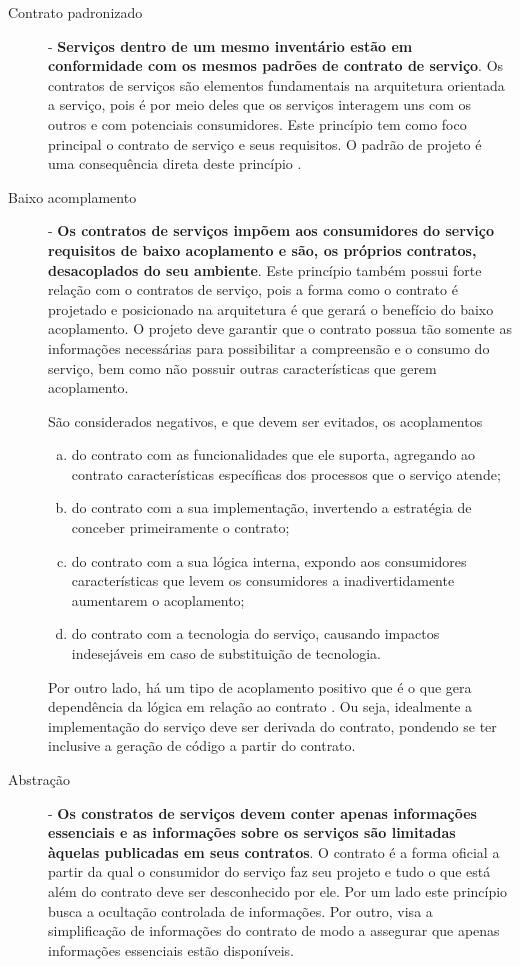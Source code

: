 \begin{description}
\item[Contrato padronizado] - \textbf{Serviços dentro de um mesmo inventário
estão em conformidade com os mesmos padrões de contrato de serviço}.
Os contratos de serviços são elementos fundamentais na arquitetura orientada a
serviço, pois é por meio deles que os serviços interagem uns com os outros e com
potenciais consumidores. Este princípio tem como foco principal o contrato de
serviço e seus requisitos. O padrão de projeto \CtFirst{} é uma
consequência direta deste princípio \cite{erl2009web}.

\item[Baixo acomplamento] - \textbf{Os contratos de serviços impõem aos
consumidores do serviço requisitos de baixo acoplamento e são, os próprios
contratos, desacoplados do seu ambiente}. 
Este princípio também possui forte relação com o contratos de serviço, pois a
forma como o contrato é projetado e posicionado na arquitetura é que gerará o
benefício do baixo acoplamento. O projeto deve garantir que o contrato
possua tão somente as informações necessárias para possibilitar a compreensão e
o consumo do serviço, bem como não possuir outras características que gerem
acoplamento.

São considerados negativos, e que devem ser evitados, os acoplamentos  
\begin{enumerate}[(a)] 
\item do contrato com as funcionalidades que ele suporta, agregando ao
contrato características específicas dos processos que o serviço atende;
\item do contrato com a sua implementação, invertendo a estratégia de conceber
primeiramente o contrato;
\item do contrato com a sua lógica interna, expondo aos consumidores
características que levem os consumidores a inadivertidamente aumentarem o
acoplamento;
\item do contrato com a tecnologia do serviço, causando impactos indesejáveis em
caso de substituição de tecnologia.
\end{enumerate}

Por outro lado, há um tipo de acoplamento positivo que é o que gera dependência
da lógica em relação ao contrato \cite{erl2009web}. Ou seja, idealmente a
implementação do serviço deve ser derivada do contrato, pondendo se ter inclusive a geração de código a
partir do contrato.


\item[Abstração] - \textbf{Os constratos de serviços devem conter apenas
informações essenciais e as informações sobre os serviços são limitadas àquelas
publicadas em seus contratos}. O contrato é a forma oficial a partir da qual o
consumidor do serviço faz seu projeto e tudo o que está além do contrato deve
ser desconhecido por ele. Por um lado este princípio busca a ocultação
controlada de informações. Por outro, visa a simplificação de informações do
contrato de modo a assegurar que apenas informações essenciais estão
disponíveis.



\end{description}
